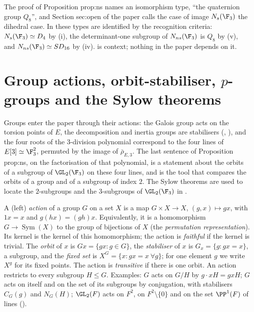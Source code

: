 \begin{paperlink}
The proof of Proposition prop:ns names an isomorphism type, ``the quaternion group $Q_8$'', and Section sec:open of the paper calls the case of
image $N_s(\F_3)$ the dihedral case. In  these types are identified by the recognition criteria: $N_s(\F_3)\simeq D_4$ by (i), the
determinant-one subgroup of $N_{ns}(\F_3)$ is $Q_8$ by (v), and $N_{ns}(\F_3)\simeq SD_{16}$ by
(iv).  is context; nothing in the paper depends on it.
\end{paperlink}

\section[Group actions, orbit-stabiliser, \texorpdfstring{$p$}{p}-groups, Sylow theorems]{Group actions, orbit-stabiliser, \texorpdfstring{$p$}{p}-groups and the Sylow theorems}\label{sec:groups:actions}

Groups enter the paper through their actions: the Galois group acts on the torsion points of $E$, the decomposition and inertia groups are
stabilisers (, ), and the four roots of the $3$-division polynomial correspond to the four lines of
$E[3]\simeq\F_3^2$, permuted by the image of $\bar\rho_{E,3}$. The last sentence of Proposition prop:ns, on the factorisation of that
polynomial, is a statement about the orbits of a subgroup of $\GL_2(\F_3)$ on these four lines, and  is the
tool that compares the orbits of a group and of a subgroup of index $2$. The Sylow theorems are used to locate the $2$-subgroups and the
$3$-subgroups of $\GL_2(\F_3)$ in .

\begin{definition}\label{def:groups:action}
A (left) \emph{action} of a group $G$ on a set $X$ is a map $G\times X\to X$, $(g,x)\mapsto gx$, with $1x=x$ and $g(hx)=(gh)x$. Equivalently, it is a
homomorphism $G\to\operatorname{Sym}(X)$ to the group of bijections of $X$ (the \emph{permutation representation}). Its kernel is the kernel of this
homomorphism; the action is \emph{faithful} if the kernel is trivial. The \emph{orbit} of $x$ is $Gx=\{gx:g\in G\}$, the \emph{stabiliser} of $x$ is
$G_x=\{g:gx=x\}$, a subgroup, and the \emph{fixed set} is $X^G=\{x:gx=x\ \forall g\}$; for one element $g$ we write $X^g$ for its fixed points. The action is
\emph{transitive} if there is one orbit. An action restricts to every subgroup $H\le G$. Examples: $G$ acts on $G/H$ by $g\cdot xH=gxH$; $G$ acts on itself
and on the set of its subgroups by conjugation, with stabilisers $C_G(g)$ and $N_G(H)$; $\GL_2(F)$ acts on $F^2$, on $F^2\setminus\{0\}$ and on
the set $\PP^1(F)$ of lines ().
\end{definition}

